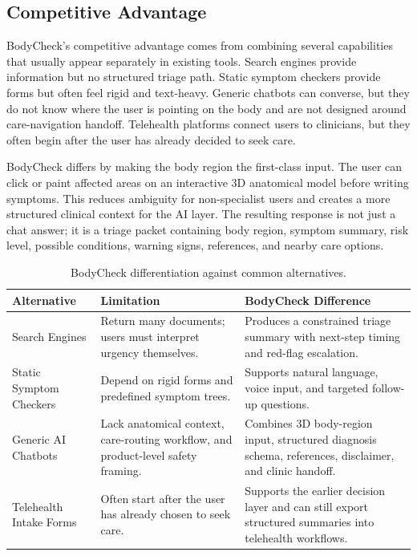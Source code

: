 \subsection{Competitive Advantage}
\label{sec:impact-competitive}

BodyCheck's competitive advantage comes from combining several capabilities
that usually appear separately in existing tools. Search engines provide
information but no structured triage path. Static symptom checkers provide
forms but often feel rigid and text-heavy. Generic chatbots can converse, but
they do not know where the user is pointing on the body and are not designed
around care-navigation handoff. Telehealth platforms connect users to
clinicians, but they often begin after the user has already decided to seek
care.

BodyCheck differs by making the body region the first-class input. The user can
click or paint affected areas on an interactive 3D anatomical model before
writing symptoms. This reduces ambiguity for non-specialist users and creates a
more structured clinical context for the AI layer. The resulting response is
not just a chat answer; it is a triage packet containing body region, symptom
summary, risk level, possible conditions, warning signs, references, and nearby
care options.

\begin{table}[htbp]
  \centering
  \caption{BodyCheck differentiation against common alternatives.}
  \label{tab:competitive_comparison}
  \setlength{\tabcolsep}{5pt}
  \renewcommand{\arraystretch}{1.45}
  \small
  \begin{tabular}{@{} p{3.2cm} p{4.8cm} p{4.8cm} @{}}
    \toprule
    \textbf{Alternative} & \textbf{Limitation} & \textbf{BodyCheck Difference} \\
    \midrule

    Search Engines &
    Return many documents; users must interpret urgency themselves. &
    Produces a constrained triage summary with next-step timing and red-flag
    escalation. \\

    Static Symptom Checkers &
    Depend on rigid forms and predefined symptom trees. &
    Supports natural language, voice input, and targeted follow-up questions. \\

    Generic AI Chatbots &
    Lack anatomical context, care-routing workflow, and product-level safety
    framing. &
    Combines 3D body-region input, structured diagnosis schema, references,
    disclaimer, and clinic handoff. \\

    Telehealth Intake Forms &
    Often start after the user has already chosen to seek care. &
    Supports the earlier decision layer and can still export structured
    summaries into telehealth workflows. \\

    \bottomrule
  \end{tabular}
\end{table}


